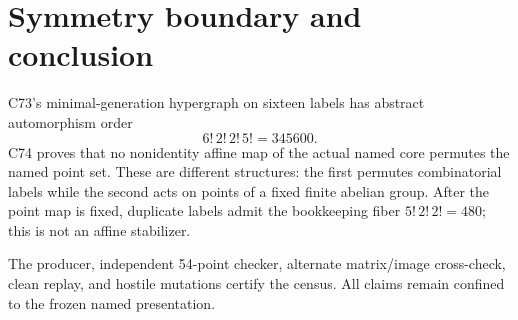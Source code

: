 \documentclass[10pt]{article}
\begin{document}
\section{Symmetry boundary and conclusion}
C73's minimal-generation hypergraph on sixteen labels has abstract
automorphism order
\[
 6!\,2!\,2!\,5!=345600.
\]
C74 proves that no nonidentity affine map of the actual named core permutes
the named point set.  These are different structures: the first permutes
combinatorial labels while the second acts on points of a fixed finite abelian
group.  After the point map is fixed, duplicate labels admit the bookkeeping
fiber $5!\,2!\,2!=480$; this is not an affine stabilizer.

The producer, independent 54-point checker, alternate matrix/image
cross-check, clean replay, and hostile mutations certify the census.  All
claims remain confined to the frozen named presentation.
\end{document}
